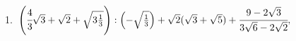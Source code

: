 1.\ $\left(\cfrac{4}{3}\sqrt{3}+\sqrt{2}+\sqrt{3\frac{1}{3}}\right): \left(-\sqrt{\frac{1}{3}}\right)+\sqrt{2}(\sqrt{3}+\sqrt{5})+\cfrac{9-2\sqrt{3}}{3\sqrt{6}-2\sqrt{2}},$\\
